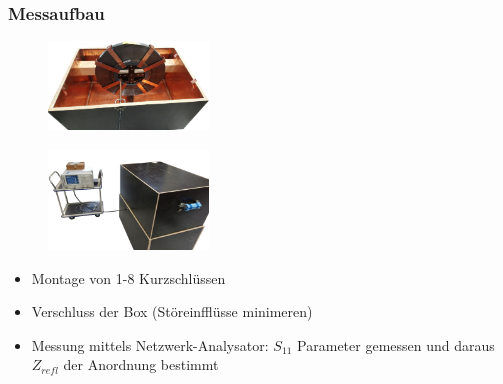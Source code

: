 \documentclass[accentcolor=tud9b, colorbacktitle, inverttitle]{tudbeamer}
\begin{document}
\begin{frame}\frametitle{Messaufbau}
\vspace{-1em}
\begin{multicols}{2}
	\begin{figure}[h]
		\centering
		\includegraphics[width=0.38\textwidth]{BoxKreuzPolygonRK8Ks}
	\end{figure}
	\begin{figure}[h]
		\centering
		\includegraphics[width=0.38\textwidth]{messstand}
	\end{figure}
	\vfill\null
	\columnbreak
	\begin{itemize}
		\item Montage von 1-8 Kurzschl\"ussen
		\item Verschluss der Box (St\"oreinffl\"usse minimeren)
		\item Messung mittels Netzwerk-Analysator: $S_{11}$ Parameter gemessen und daraus $Z_{refl}$ der Anordnung bestimmt
	\end{itemize}
\end{multicols}
\end{frame}
\end{document}
